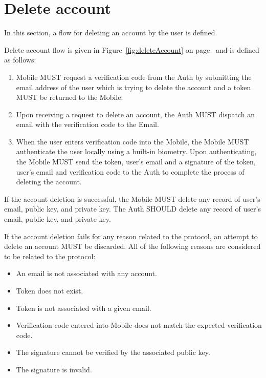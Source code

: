 \section{Delete account}
In this section, a flow for deleting an account by the user is defined. 
\medskip

Delete account flow is given in Figure~\ref{fig:deleteAccount} on page~\pageref{fig:deleteAccount} and is defined 
as follows:
    \begin{enumerate}
        \item Mobile MUST request a verification code from the Auth by submitting the email address of the user
              which is trying to delete the account and a token MUST be returned to the Mobile.
        \item Upon receiving a request to delete an account, the Auth MUST dispatch an email with the verification
              code to the Email.
        \item When the user enters verification code into the Mobile, the Mobile MUST authenticate the user locally 
              using a built-in biometry. Upon authenticating, the Mobile MUST send the token, user's email and a 
              signature of the token, user's email and verification code to the Auth to complete the process of 
              deleting the account.
    \end{enumerate}
    
If the account deletion is successful, the Mobile MUST delete any record of user's email, public key, and 
private key. The Auth SHOULD delete any record of user's email, public key, and private key.
\medskip

If the account deletion fails for any reason related to the protocol, an attempt to delete an account MUST be 
discarded. All of the following reasons are considered to be related to the protocol:
    \begin{itemize}
        \item An email is not associated with any account.
        \item Token does not exist.
        \item Token is not associated with a given email.
        \item Verification code entered into Mobile does not match the expected verification code.
        \item The signature cannot be verified by the associated public key.
        \item The signature is invalid.
    \end{itemize}
